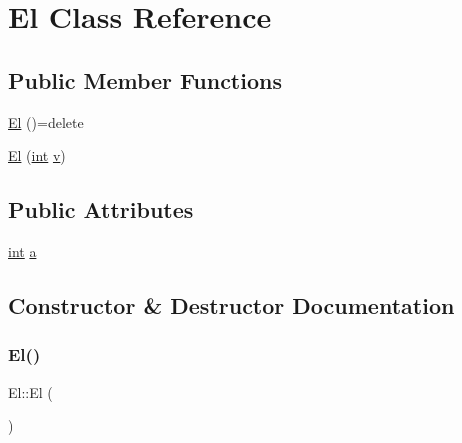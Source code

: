 \hypertarget{class_el}{}\section{El Class Reference}
\label{class_el}
\subsection*{Public Member Functions}
\begin{DoxyCompactItemize}
\item 
\mbox{\hyperlink{class_el_a69c81ad188f4b2ad11e53243d80d6ea1}{El}} ()=delete
\item 
\mbox{\hyperlink{class_el_a66214f1102020042124f71c73cf83253}{El}} (\mbox{\hyperlink{warnings_8h_a74f207b5aa4ba51c3a2ad59b219a423b}{int}} \mbox{\hyperlink{_s_d_l__opengl_8h_a10a82eabcb59d2fcd74acee063775f90}{v}})
\end{DoxyCompactItemize}
\subsection*{Public Attributes}
\begin{DoxyCompactItemize}
\item 
\mbox{\hyperlink{warnings_8h_a74f207b5aa4ba51c3a2ad59b219a423b}{int}} \mbox{\hyperlink{class_el_a15afd3737e7710315fc5808f9188d0fe}{a}}
\end{DoxyCompactItemize}


\subsection{Constructor \& Destructor Documentation}
\mbox{\label{class_el_a69c81ad188f4b2ad11e53243d80d6ea1}} 
\subsubsection{\texorpdfstring{El()}{El()}\hspace{0.1cm}{\footnotesize\ttfamily [1/2]}}
{\footnotesize\ttfamily El\+::\+El (\begin{DoxyParamCaption}{ }\end{DoxyParamCaption})\hspace{0.3cm}{\ttfamily [delete]}}

\mbox{\label{class_el_a66214f1102020042124f71c73cf83253}} 
